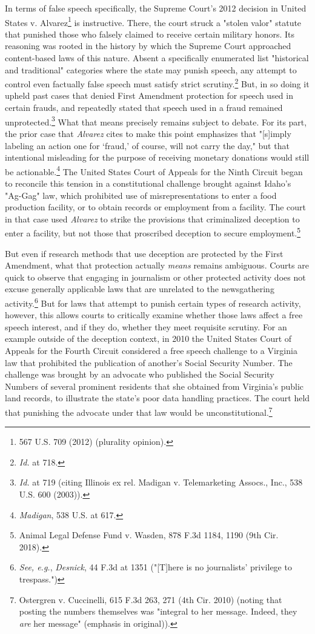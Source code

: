 In terms of false speech specifically, the Supreme Court's 2012 decision in United States v. Alvarez\footnote{567 U.S. 709 (2012) (plurality opinion).} is instructive. There, the court struck a "stolen valor" statute that punished those who falsely claimed to receive certain military honors. Its reasoning was rooted in the history by which the Supreme Court approached content-based laws of this nature. Absent a specifically enumerated list "historical and traditional" categories where the state may punish speech, any attempt to control even factually false speech must satisfy strict scrutiny.\footnote{\textit{Id.} at 718.} But, in so doing it upheld past cases that denied First Amendment protection for speech used in certain frauds, and repeatedly stated that speech used in a fraud remained unprotected.\footnote{\textit{Id.} at 719 (citing Illinois ex rel. Madigan v. Telemarketing Assocs., Inc., 538 U.S. 600 (2003)).} What that means precisely remains subject to debate. For its part, the prior case that \textit{Alvarez} cites to make this point emphasizes that "[s]imply labeling an action one for `fraud,' of course, will not carry the day," but that intentional misleading for the purpose of receiving monetary donations would still be actionable.\footnote{\textit{Madigan}, 538 U.S. at 617.} The United States Court of Appeals for the Ninth Circuit began to reconcile this tension in a constitutional challenge brought against Idaho's "Ag-Gag" law, which prohibited use of misrepresentations to enter a food production facility, or to obtain records or employment from a facility. The court in that case used \textit{Alvarez} to strike the provisions that criminalized deception to enter a facility, but not those that proscribed deception to secure employment.\footnote{Animal Legal Defense Fund v. Wasden, 878 F.3d 1184, 1190 (9th Cir. 2018).} 

But even if research methods that use deception are protected by the First Amendment, what that protection actually \textit{means} remains ambiguous. Courts are quick to observe that engaging in journalism or other protected activity does not excuse generally applicable laws that are unrelated to the newsgathering activity.\footnote{\textit{See, e.g.}, \textit{Desnick}, 44 F.3d at 1351 ("[T]here is no journalists' privilege to trespass.")} But for laws that attempt to punish certain types of research activity, however, this allows courts to critically examine whether those laws affect a free speech interest, and if they do, whether they meet requisite scrutiny. For an example outside of the deception context, in 2010 the United States Court of Appeals for the Fourth Circuit considered a free speech challenge to a Virginia law that prohibited the publication of another's Social Security Number. The challenge was brought by an advocate who published the Social Security Numbers of several prominent residents that she obtained from Virginia's public land records, to illustrate the state's poor data handling practices. The court held that punishing the advocate under that law would be unconstitutional.\footnote{Ostergren v. Cuccinelli, 615 F.3d 263, 271 (4th Cir. 2010) (noting that posting the numbers themselves was "integral to her message. Indeed, they \textit{are} her message" (emphasis in original)).} 

